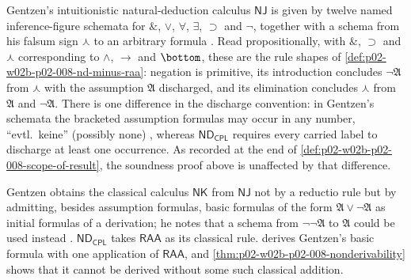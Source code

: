 Gentzen's intuitionistic natural-deduction calculus \(\mathsf{NJ}\) is
given by twelve named inference-figure schemata for \(\&\), \(\lor\),
\(\forall\), \(\exists\), \(\supset\) and \(\neg\), together with a schema
from his falsum sign \(\curlywedge\) to an arbitrary formula
\cite[2.21, pp.~185--186]{Gentzen1934a}.  Read propositionally, with
\(\&\), \(\supset\) and \(\curlywedge\) corresponding to \(\land\), \(\to\)
and \(\bottom\), these are the rule shapes of
\cref{def:p02-w02b-p02-008-nd-minus-raa}: negation is primitive, its
introduction concludes \(\neg\mathfrak A\) from \(\curlywedge\) with the
assumption \(\mathfrak A\) discharged, and its elimination concludes
\(\curlywedge\) from \(\mathfrak A\) and \(\neg\mathfrak A\).  There is one
difference in the discharge convention: in Gentzen's schemata the bracketed
assumption formulas may occur in any number, ``evtl.\ keine'' (possibly
none) \cite[2.21, p.~185]{Gentzen1934a}, whereas \(\mathsf{ND}_{\mathsf{CPL}}\)
requires every carried label to discharge at least one occurrence.  As
recorded at the end of \cref{def:p02-w02b-p02-008-scope-of-result}, the
soundness proof above is unaffected by that difference.

Gentzen obtains the classical calculus \(\mathsf{NK}\) from \(\mathsf{NJ}\) not
by a reductio rule but by admitting, besides assumption formulas, basic
formulas of the form \(\mathfrak A\lor\neg\mathfrak A\) as initial formulas of
a derivation; he notes that a schema from \(\neg\neg\mathfrak A\) to
\(\mathfrak A\) could be used instead \cite[5.3, p.~190]{Gentzen1934a}.
\(\mathsf{ND}_{\mathsf{CPL}}\) takes \(\mathsf{RAA}\) as its classical rule.
 derives Gentzen's basic
formula with one application of \(\mathsf{RAA}\), and
\cref{thm:p02-w02b-p02-008-nonderivability} shows that it cannot be derived
without some such classical addition.
